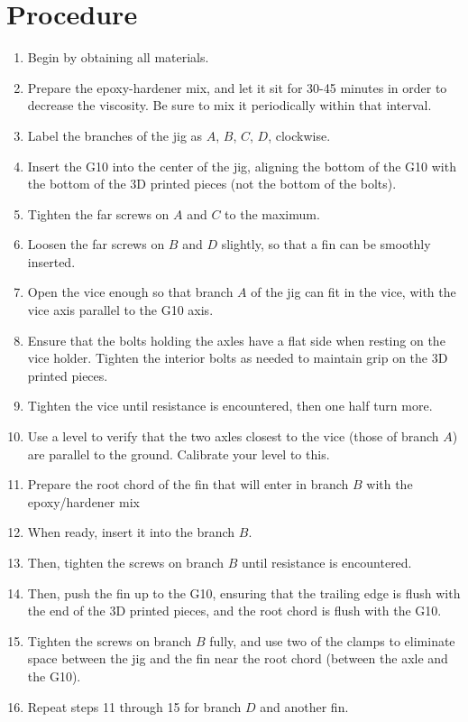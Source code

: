 \documentclass{amsdtx}
\begin{document}
\section{Procedure}
\begin{enumerate}
	\item Begin by obtaining all materials.
	\item Prepare the epoxy-hardener mix, and let it sit for 30-45 minutes in order to decrease the viscosity. Be sure to mix it periodically within that interval.
	\item Label the branches of the jig as $A$, $B$, $C$, $D$, clockwise.
	\item Insert the G10 into the center of the jig, aligning the bottom of the G10 with the bottom of the 3D printed pieces (not the bottom of the bolts).
	\item Tighten the far screws on $A$ and $C$ to the maximum.
	\item Loosen the far screws on $B$ and $D$ slightly, so that a fin can be smoothly inserted. 
	\item Open the vice enough so that branch $A$ of the jig can fit in the vice, with the vice axis parallel to the G10 axis.
	\item Ensure that the bolts holding the axles have a flat side when resting on the vice holder. Tighten the interior bolts as needed to maintain grip on the 3D printed pieces.
	\item Tighten the vice until resistance is encountered, then one half turn more.
	\item Use a level to verify that the two axles closest to the vice (those of branch $A$) are parallel to the ground. Calibrate your level to this.
	\item Prepare the root chord of the fin that will enter in branch $B$ with the epoxy/hardener mix
	\item When ready, insert it into the branch $B$. 
	\item Then, tighten the screws on branch $B$ until resistance is encountered.
	\item Then, push the fin up to the G10, ensuring that the trailing edge is flush with the end of the 3D printed pieces, and the root chord is flush with the G10.
	\item Tighten the screws on branch $B$ fully, and use two of the clamps to eliminate space between the jig and the fin near the root chord (between the axle and the G10).
	\item Repeat steps 11 through 15 for branch $D$ and another fin.

\end{enumerate}
\end{document}
